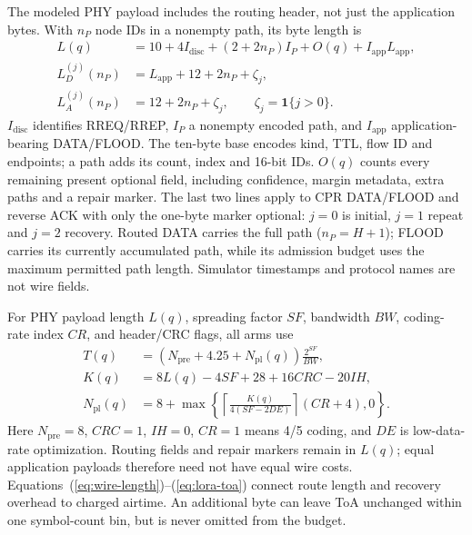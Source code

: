 \documentclass[conference,letterpaper,10pt]{IEEEtran}
\begin{document}
The modeled PHY payload includes the routing header, not just the
application bytes. With $n_P$ node IDs in a nonempty path, its byte length is
\begin{equation}
\begin{aligned}
L(q)&=10+4I_{\mathrm{disc}}+(2+2n_P)I_P
       +O(q)+I_{\mathrm{app}}L_{\mathrm{app}},\\
L_D^{(j)}(n_P)&=L_{\mathrm{app}}+12+2n_P+\zeta_j,\\
L_A^{(j)}(n_P)&=12+2n_P+\zeta_j,\qquad
 \zeta_j=\mathbf 1\{j>0\}.
\end{aligned}
\label{eq:wire-length}
\end{equation}
$I_{\mathrm{disc}}$ identifies RREQ/RREP, $I_P$ a nonempty encoded path,
and $I_{\mathrm{app}}$ application-bearing DATA/FLOOD. The ten-byte base
encodes kind, TTL, flow ID and endpoints; a path adds its count, index and
16-bit IDs. $O(q)$ counts every remaining present optional field, including
confidence, margin metadata, extra paths and a repair marker. The last two
lines apply to CPR DATA/FLOOD and reverse ACK with only the one-byte marker
optional: $j=0$ is initial, $j=1$ repeat and $j=2$ recovery. Routed DATA
carries the full path ($n_P=H+1$); FLOOD carries its currently accumulated
path, while its admission budget uses the maximum permitted path length.
Simulator timestamps and protocol names are not wire fields.

For PHY payload length $L(q)$, spreading factor $SF$, bandwidth $BW$,
coding-rate index $CR$, and header/CRC flags, all arms use
\begin{equation}
\begin{aligned}
T(q)&=\left(N_{\mathrm{pre}}+4.25+N_{\mathrm{pl}}(q)\right)
       \frac{2^{SF}}{BW},\\
K(q)&=8L(q)-4SF+28+16CRC-20IH,\\
N_{\mathrm{pl}}(q)&=8+\max\!\left\{
 \left\lceil\frac{K(q)}{4(SF-2DE)}\right\rceil(CR+4),0\right\}.
\end{aligned}
\label{eq:lora-toa}
\end{equation}
Here $N_{\mathrm{pre}}=8$, $CRC=1$, $IH=0$, $CR=1$ means 4/5 coding, and
$DE$ is low-data-rate optimization. Routing fields and repair markers remain
in $L(q)$; equal application payloads therefore need not have equal wire costs.
Equations~(\ref{eq:wire-length})--(\ref{eq:lora-toa}) connect route length
and recovery overhead to charged airtime. An additional byte can leave ToA
unchanged within one symbol-count bin, but is never omitted from the budget.
\end{document}
